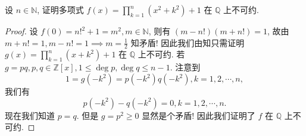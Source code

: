 \documentclass[../../main.tex]{subfiles}
\begin{document}
\begin{example}
设 \( n \in \mathbb{N} \), 证明多项式 \( f(x) = \prod_{k=1}^n (x^2 + k^2) + 1 \) 在 \( \mathbb{Q} \) 上不可约.
\end{example}
\begin{proof}
设 \( f(0) = n!^2 + 1 = m^2, m \in \mathbb{N} \), 则有 \( (m - n!)(m + n!) = 1 \), 故由 \( m + n! = 1, m - n! = 1 \implies m = \frac{1}{2} \) 知矛盾! 因此我们由知只需证明 \( g(x) = \prod_{k=1}^n (x + k^2) + 1 \) 在 \( \mathbb{Q} \) 上不可约. 若 \( g = pq, p,q \in \mathbb{Z}[x], 1 \leq \deg p, \deg q \leq n - 1 \). 注意到
\[
1 = g(-k^2) = p(-k^2)q(-k^2), k = 1,2,\cdots,n,
\]
我们有
\[
p(-k^2) - q(-k^2) = 0, k = 1,2,\cdots,n.
\]
现在我们知道 \( p = q \). 但是 \( g = p^2 \geq 0 \) 显然是个矛盾! 因此我们证明了 \( f \) 在 \( \mathbb{Q} \) 上不可约.

\end{proof}
\end{document}
